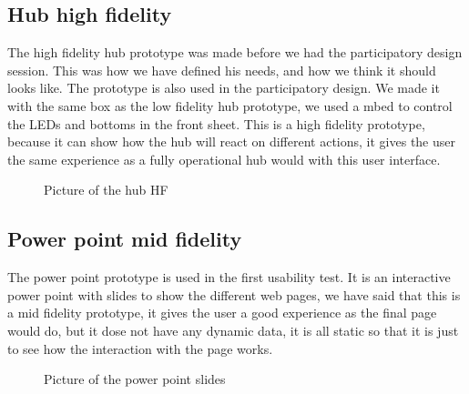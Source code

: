 \subsection{Hub high fidelity}
The high fidelity hub prototype was made before we had the participatory design session. This was how we have defined his needs, and how we think it should looks like. The prototype is also used in the participatory design. We made it with the same box as the low fidelity hub prototype, we used a mbed to control the LEDs and bottoms in the front sheet. This is a high fidelity prototype, because it can show how the hub will react on different actions, it gives the user the same experience as a fully operational hub would with this user interface.
\begin{figure}[H]
	\center
		\setlength\fboxsep{0pt}
		\setlength\fboxrule{1pt}
   	\caption{Picture of the hub HF}
   	\label{fig:High fidelity hub}
\end{figure}

\subsection{Power point mid fidelity}
The power point prototype is used in the first usability test. It is an interactive power point with slides to show the different web pages, we have said that this is a mid fidelity prototype, it gives the user a good experience as the final page would do, but it dose not have any dynamic data, it is all static so that it is just to see how the interaction with the page works.
\begin{figure}[H]
	\center
		\setlength\fboxsep{0pt}
		\setlength\fboxrule{1pt}
   	\caption{Picture of the power point slides}
   	\label{fig:web_interface1}
\end{figure}

